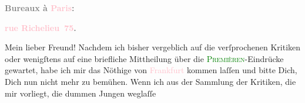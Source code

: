            \pstart
           \begin{otherlanguage}{french}\textcolor{gray}{\textbf{\textbf{Bureaux à \textcolor{pink}{Paris}{}\ledrightnote{\textcolor{pink}{Paris}}:}}}\end{otherlanguage}\pend
           \pstart
           \begin{otherlanguage}{french}\textcolor{gray}{\textbf{\textbf{\textcolor{pink}{rue Richelieu 75}{}\ledrightnote{\textcolor{pink}{rue Richelieu}}.}}}\end{otherlanguage}\pend
           \pstart\center{}Mein lieber Freund!\pend\pstart
           Nachdem ich bisher vergeblich auf die verſprochenen Kritiken oder wenigſtens auf eine
               briefliche Mittheilung über die \textsc{\textcolor{green}{Premièren}{}}-Eindrücke gewartet, habe ich mir das Nöthige von \textcolor{pink}{Frankfurt}{}\ledrightnote{\textcolor{pink}{Frankfurt am Main}} kommen laſſen und bitte Dich, Dich nun nicht mehr zu bemühen.\pend
           \pstart
           Wenn ich aus der Sammlung der Kritiken, die mir vorliegt, die dummen Jungen weglaſſe

